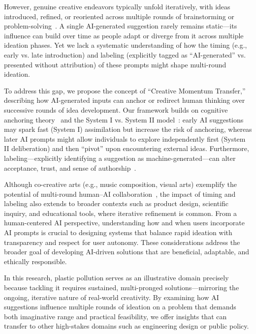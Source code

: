 \documentclass{article}
\begin{document}
However, genuine creative endeavors typically unfold iteratively, with ideas introduced, refined, or reoriented across multiple rounds of brainstorming or problem-solving~\cite{tolkamp2023creativity,zamani2022closer}. A single AI-generated suggestion rarely remains static—its influence can build over time as people adapt or diverge from it across multiple ideation phases. Yet we lack a systematic understanding of how the timing (e.g., early vs. late introduction) and labeling (explicitly tagged as “AI-generated” vs. presented without attribution) of these prompts might shape multi-round ideation.

To address this gap, we propose the concept of “Creative Momentum Transfer,” describing how AI-generated inputs can anchor or redirect human thinking over successive rounds of idea development. Our framework builds on cognitive anchoring theory~\cite{tversky1974judgment} and the System I vs. System II model~\cite{kahneman2011thinking}: early AI suggestions may spark fast (System I) assimilation but increase the risk of anchoring, whereas later AI prompts might allow individuals to explore independently first (System II deliberation) and then “pivot” upon encountering external ideas. Furthermore, labeling—explicitly identifying a suggestion as machine-generated—can alter acceptance, trust, and sense of authorship~\cite{brachman2022reliance}.

Although co-creative arts (e.g., music composition, visual arts) exemplify the potential of multi-round human–AI collaboration~\cite{rezwana2023designing}, the impact of timing and labeling also extends to broader contexts such as product design, scientific inquiry, and educational tools, where iterative refinement is common. From a human-centered AI perspective, understanding how and when users incorporate AI prompts is crucial to designing systems that balance rapid ideation with transparency and respect for user autonomy. These considerations address the broader goal of developing AI-driven solutions that are beneficial, adaptable, and ethically responsible. 

In this research, plastic pollution serves as an illustrative domain precisely because tackling it requires sustained, multi-pronged solutions—mirroring the ongoing, iterative nature of real-world creativity. By examining how AI suggestions influence multiple rounds of ideation on a problem that demands both imaginative range and practical feasibility, we offer insights that can transfer to other high-stakes domains such as engineering design or public policy.
\end{document}
